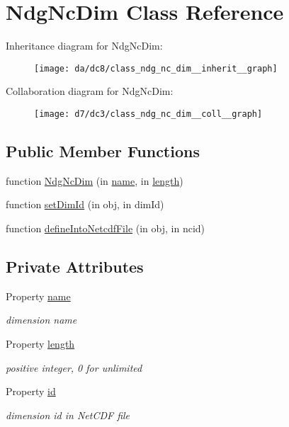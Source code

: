 \hypertarget{class_ndg_nc_dim}{}\section{Ndg\+Nc\+Dim Class Reference}
\label{class_ndg_nc_dim}


Inheritance diagram for Ndg\+Nc\+Dim\+:
\nopagebreak
\begin{figure}[H]
\begin{center}
\leavevmode
\texttt{[image: da/dc8/class\_ndg\_nc\_dim\_\_inherit\_\_graph]}
\end{center}
\end{figure}


Collaboration diagram for Ndg\+Nc\+Dim\+:
\nopagebreak
\begin{figure}[H]
\begin{center}
\leavevmode
\texttt{[image: d7/dc3/class\_ndg\_nc\_dim\_\_coll\_\_graph]}
\end{center}
\end{figure}
\subsection*{Public Member Functions}
\begin{DoxyCompactItemize}
\item 
function \hyperlink{class_ndg_nc_dim_a161eed119d182fad9b715188167d0b83}{Ndg\+Nc\+Dim} (in \hyperlink{class_ndg_nc_dim_a9dc41cf16574a93a3eebd9419bd99a98}{name}, in \hyperlink{class_ndg_nc_dim_a08430bf2264f06c738e7e5a0a94fa577}{length})
\item 
function \hyperlink{class_ndg_nc_dim_aa9738f1e8e65cf90a73374b479ed7b18}{set\+Dim\+Id} (in obj, in dim\+Id)
\item 
function \hyperlink{class_ndg_nc_dim_acedf0835f73fe068e45526d3448ccff7}{define\+Into\+Netcdf\+File} (in obj, in ncid)
\end{DoxyCompactItemize}
\subsection*{Private Attributes}
\begin{DoxyCompactItemize}
\item 
Property \hyperlink{class_ndg_nc_dim_a9dc41cf16574a93a3eebd9419bd99a98}{name}
\begin{DoxyCompactList}\small\item\em dimension name \end{DoxyCompactList}\item 
Property \hyperlink{class_ndg_nc_dim_a08430bf2264f06c738e7e5a0a94fa577}{length}
\begin{DoxyCompactList}\small\item\em positive integer, 0 for unlimited \end{DoxyCompactList}\item 
Property \hyperlink{class_ndg_nc_dim_ab5bdbcb5bc55a3557e7d8a902e8dad7e}{id}
\begin{DoxyCompactList}\small\item\em dimension id in Net\+C\+DF file \end{DoxyCompactList}\end{DoxyCompactItemize}


